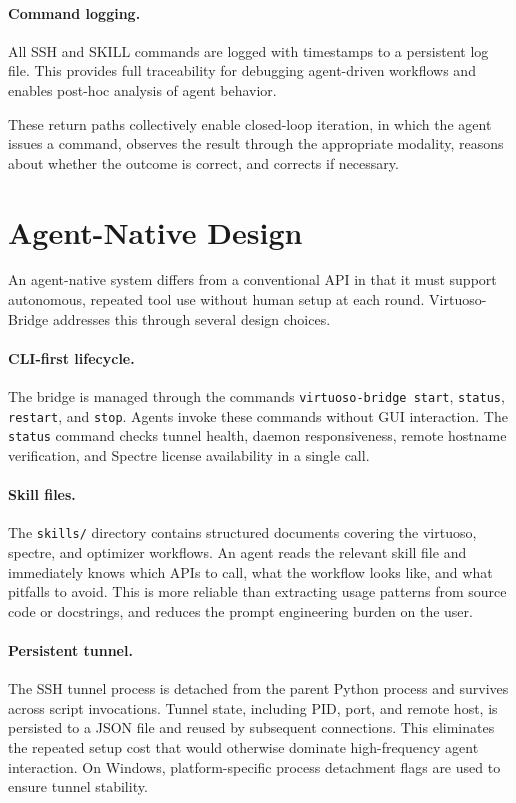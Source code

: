 \documentclass[lettersize,journal]{ieee_template/IEEEtran}
\begin{document}
\paragraph{Command logging.} All SSH and SKILL commands are logged with timestamps to a persistent log file. This provides full traceability for debugging agent-driven workflows and enables post-hoc analysis of agent behavior.

These return paths collectively enable closed-loop iteration, in which the agent issues a command, observes the result through the appropriate modality, reasons about whether the outcome is correct, and corrects if necessary.

\section{Agent-Native Design}

An agent-native system differs from a conventional API in that it must support autonomous, repeated tool use without human setup at each round. Virtuoso-Bridge addresses this through several design choices.

\paragraph{CLI-first lifecycle.} The bridge is managed through the commands \texttt{virtuoso-bridge start}, \texttt{status}, \texttt{restart}, and \texttt{stop}. Agents invoke these commands without GUI interaction. The \texttt{status} command checks tunnel health, daemon responsiveness, remote hostname verification, and Spectre license availability in a single call.

\paragraph{Skill files.} The \texttt{skills/} directory contains structured documents covering the virtuoso, spectre, and optimizer workflows. An agent reads the relevant skill file and immediately knows which APIs to call, what the workflow looks like, and what pitfalls to avoid. This is more reliable than extracting usage patterns from source code or docstrings, and reduces the prompt engineering burden on the user.

\paragraph{Persistent tunnel.} The SSH tunnel process is detached from the parent Python process and survives across script invocations. Tunnel state, including PID, port, and remote host, is persisted to a JSON file and reused by subsequent connections. This eliminates the repeated setup cost that would otherwise dominate high-frequency agent interaction. On Windows, platform-specific process detachment flags are used to ensure tunnel stability.
\end{document}

